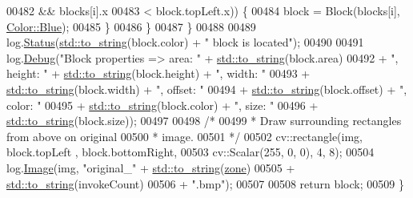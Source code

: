 \begin{DoxyCode}
00482                             && blocks[i].x
00483                             < block.topLeft.x)) \{
00484                     block = Block(blocks[i], \hyperlink{definitions_8hpp_abc05a0f46084a3477cf5d5c939ff1436a9594eec95be70e7b1710f730fdda33d9}{Color::Blue});
00485                 \}
00486             \}
00487         \}
00488 
00489         log.\hyperlink{classChipChipArray_1_1Log_a66575b6e94c6112e4cefa5736cb996e0}{Status}(\hyperlink{namespacestd_aa5ddf582a1c96ffe258c997be9a294a3}{std::to\_string}(block.color) + \textcolor{stringliteral}{" block is located"});
00490 
00491         log.\hyperlink{classChipChipArray_1_1Log_ac32b435af1577e4ebc67af2bdfea8eff}{Debug}(\textcolor{stringliteral}{"Block properties => area: "} + \hyperlink{namespacestd_aa5ddf582a1c96ffe258c997be9a294a3}{std::to\_string}(block.area)
00492                 + \textcolor{stringliteral}{", height: "} + \hyperlink{namespacestd_aa5ddf582a1c96ffe258c997be9a294a3}{std::to\_string}(block.height) + \textcolor{stringliteral}{", width: "}
00493                 + \hyperlink{namespacestd_aa5ddf582a1c96ffe258c997be9a294a3}{std::to\_string}(block.width) + \textcolor{stringliteral}{", offset: "}
00494                 + \hyperlink{namespacestd_aa5ddf582a1c96ffe258c997be9a294a3}{std::to\_string}(block.offset) + \textcolor{stringliteral}{", color: "}
00495                 + \hyperlink{namespacestd_aa5ddf582a1c96ffe258c997be9a294a3}{std::to\_string}(block.color) + \textcolor{stringliteral}{", size: "}
00496                 + \hyperlink{namespacestd_aa5ddf582a1c96ffe258c997be9a294a3}{std::to\_string}(block.size));
00497 
00498         \textcolor{comment}{/* }
00499 \textcolor{comment}{         * Draw surrounding rectangles from above on original}
00500 \textcolor{comment}{         * image.}
00501 \textcolor{comment}{         */}
00502         cv::rectangle(img, block.topLeft , block.bottomRight,
00503                 cv::Scalar(255, 0, 0), 4, 8);
00504         log.\hyperlink{classChipChipArray_1_1Log_a65bbab057c8b1453f9e4efcfee7522c4}{Image}(img, \textcolor{stringliteral}{"original\_"} + \hyperlink{namespacestd_aa5ddf582a1c96ffe258c997be9a294a3}{std::to\_string}(\hyperlink{classChipChipArray_1_1Grabber_ab57efe6e0b6f369b19528285a278d967}{zone})
00505                 + \hyperlink{namespacestd_aa5ddf582a1c96ffe258c997be9a294a3}{std::to\_string}(invokeCount)
00506                 + \textcolor{stringliteral}{".bmp"});
00507 
00508         \textcolor{keywordflow}{return} block;
00509     \}
\end{DoxyCode}


